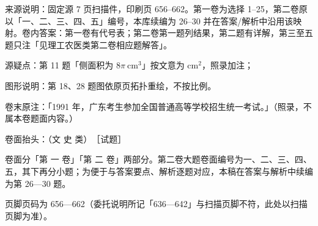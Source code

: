 

\begin{gktip}
来源说明：固定源 7 页扫描件，印刷页 656–662。第一卷为选择 1–25，第二卷原以「一、二、三、四、五」编号，本库续编为 26–30 并在答案/解析中沿用该映射。卷内答案：第一卷有代号表；第二卷第一题列结果，第二题有详解，第三至五题只注「见理工农医类第二卷相应题解答」。

源疑点：第 11 题「侧面积为 $8\pi\ \mathrm{cm}^3$」按文意为 $\mathrm{cm}^2$，照录加注；

图形说明：第 18、28 题图依原页拓扑重绘，不按比例。

卷末原注：「1991 年，广东考生参加全国普通高等学校招生统一考试。」（照录，不属本卷题面内容。）
\end{gktip}

\begin{gktip}
卷面抬头：（文 史 类）　［试题］

卷面分「第 一 卷」「第 二 卷」两部分。第二卷大题卷面编号为一、二、三、四、五，其下再分小题；为便于与答案要点、解析逐题对应，本稿在答案与解析中续编为第 26—30 题。

页脚页码为 656—662（委托说明所记「636—642」与扫描页脚不符，此处以扫描页脚为准）。
\end{gktip}


